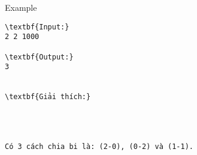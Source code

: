 Example
\begin{verbatim}
\textbf{Input:}
2 2 1000

\textbf{Output:}
3


\textbf{Giải thích:}




Có 3 cách chia bi là: (2-0), (0-2) và (1-1).\end{verbatim}